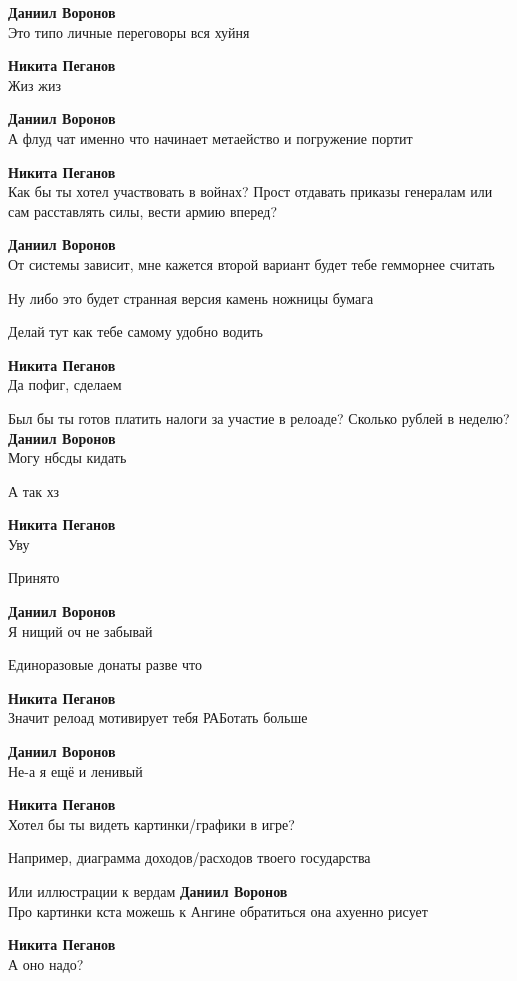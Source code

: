\begin{tabbing}
\textbf{Даниил Воронов} \\
Это типо личные переговоры вся хуйня

\textbf{Никита Пеганов} \\
Жиз жиз

\textbf{Даниил Воронов} \\
А флуд чат именно что начинает метаейство и погружение портит

\textbf{Никита Пеганов} \\
Как бы ты хотел участвовать в войнах? Прост отдавать приказы генералам или сам расставлять силы, вести армию вперед?

\textbf{Даниил Воронов} \\
От системы зависит, мне кажется второй вариант будет тебе гемморнее считать

Ну либо это будет странная версия камень ножницы бумага

Делай тут как тебе самому удобно водить

\textbf{Никита Пеганов} \\
Да пофиг, сделаем

Был бы ты готов платить налоги за участие в релоаде? Сколько рублей в неделю?
\textbf{Даниил Воронов} \\
Могу нбсды кидать

А так хз

\textbf{Никита Пеганов} \\
Уву

Принято

\textbf{Даниил Воронов} \\
Я нищий оч не забывай

Единоразовые донаты разве что

\textbf{Никита Пеганов} \\
Значит релоад мотивирует тебя РАБотать больше

\textbf{Даниил Воронов} \\
Не-а я ещё и ленивый

\textbf{Никита Пеганов} \\
Хотел бы ты видеть картинки/графики в игре?

Например, диаграмма доходов/расходов твоего государства

Или иллюстрации к вердам
\textbf{Даниил Воронов} \\
Про картинки кста можешь к Ангине обратиться она ахуенно рисует

\textbf{Никита Пеганов} \\
А оно надо?


\end{tabbing}
